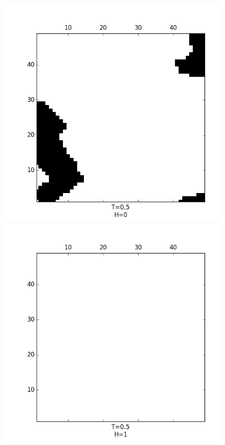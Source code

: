 \documentclass[slovene,11pt,a4paper]{article}
\numberwithin{equation}{section} %
\numberwithin{figure}{section} %
\numberwithin{table}{section} %
\begin{document}
\begin{figure}[!ht]
\centering
\begin{minipage}{0.5\textwidth}
\centering
\includegraphics[scale=0.5]{slike/zunanje0T05plus.png}
\end{minipage}\hfill
\begin{minipage}{0.5\textwidth}
\centering
\includegraphics[scale=0.5]{slike/zunanje1T05plus.png}

\end{minipage}
\end{figure}
\end{document}
